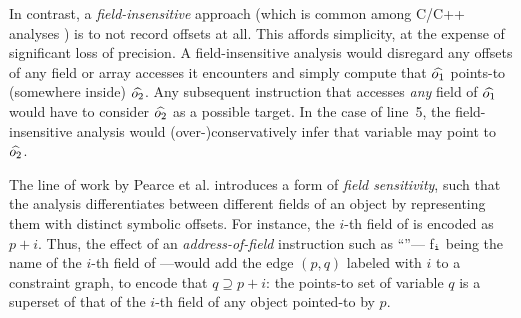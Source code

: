 In contrast, a \emph{field-insensitive} approach (which is common
among C/C++ analyses
\cite{antgrasshopper,toplas/HindBCC99,popl/ZhengR08,pldi/HeintzeT01a,pldi/Das00,sas/HardekopfL07})
is to not record offsets at all. This affords simplicity, at the
expense of significant loss of precision. A field-insensitive analysis
would disregard any offsets of any field or array accesses it
encounters and simply compute that $\widehat{o_1}$ points-to (somewhere
inside) $\widehat{o_2}$. Any subsequent instruction that accesses
\emph{any} field of $\widehat{o_1}$ would have to consider $\widehat{o_2}$
as a possible target. In the case of line~5, the field-insensitive
analysis would (over-)conservatively infer that variable 
may point to $\widehat{o_2}$.




The line of work by Pearce et al.
\cite{paste/PearceKH04,toplas/PearceKH07} introduces a form of
\emph{field sensitivity}, such that the analysis differentiates between
different fields of an object by representing them with distinct
symbolic offsets. For instance, the $i$-th field of  is
encoded as $p + i$. Thus, the effect of an \emph{address-of-field}
instruction such as ``''---
f$_{\texttt{i}}$ being the name of the $i$-th field of ---would
add the edge $(p,q)$ labeled with $i$ to a constraint graph, to
encode that $q \supseteq p + i$: the points-to set of variable $q$
is a superset of that of the $i$-th field of any object pointed-to
by $p$.

